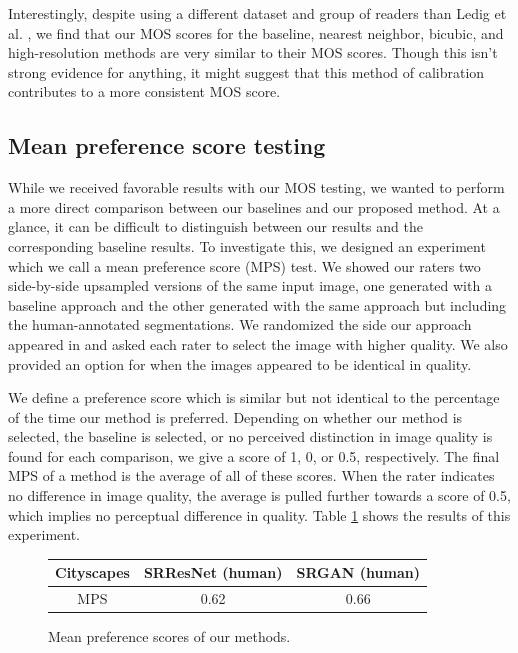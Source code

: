 \documentclass[10pt,twocolumn,letterpaper]{article}
\begin{document}
Interestingly, despite using a different dataset and group of readers than
Ledig et al. \cite{SRGAN}, we find that our MOS scores for the baseline,
nearest neighbor, bicubic, and high-resolution methods are very similar to
their MOS scores. Though this isn't strong evidence for anything, it might
suggest that this method of calibration contributes to a more consistent MOS
score.

\subsection{Mean preference score testing}
While we received favorable results with our MOS testing, we wanted to perform
a more direct comparison between our baselines and our proposed method. At a
glance, it can be difficult to distinguish between our results and the
corresponding baseline results. To investigate this, we designed an experiment
which we call a mean preference score (MPS) test. We showed our raters two
side-by-side upsampled versions of the same input image, one generated with a
baseline approach and the other generated with the same approach but including
the human-annotated segmentations. We randomized the side our approach appeared
in and asked each rater to select the image with higher quality. We also
provided an option for when the images appeared to be identical in quality.

We define a preference score which is similar but not identical to the
percentage of the time our method is preferred. Depending on whether our method
is selected, the baseline is selected, or no perceived distinction in image
quality is found for each comparison, we give a score of 1, 0, or 0.5,
respectively. The final MPS of a method is the average of all of these scores.
When the rater indicates no difference in image quality, the average is pulled
further towards a score of 0.5, which implies no perceptual difference in
quality. Table \ref{fig:mps} shows the results of this experiment.

\begin{figure}[ht!]
    \begin{center}
        \small
        \begin{tabular}{c cc}
            \textbf{Cityscapes} & SRResNet (human) & SRGAN (human) \\
            \hline
            MPS & 0.62 & 0.66
        \end{tabular}
    \end{center}
    \caption{Mean preference scores of our methods.}
    \label{fig:mps}
\end{figure}
\end{document}
